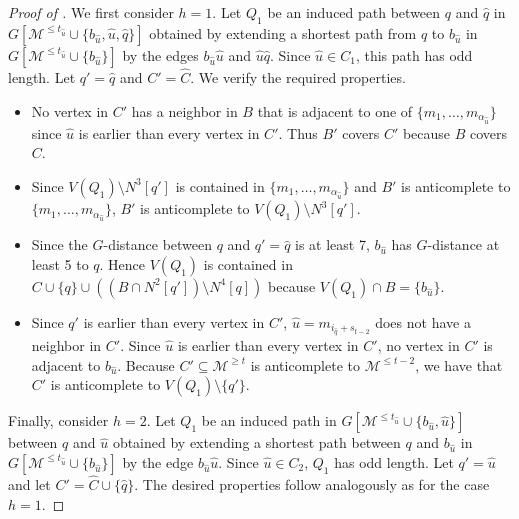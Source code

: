 \documentclass{article}
\begin{document}
\begin{proof}[Proof of ]
We first consider $h = 1$.
Let $Q_1$ be an induced path between $q$ and $\hat{q}$ in $G[\mathcal{M}^{\leq t_{\hat{u}}} \cup \{b_{\hat{u}}, \hat{u}, \hat{q}\}]$ obtained by extending a shortest path from $q$ to $b_{\hat{u}}$ in $G[ \mathcal{M}^{\leq t_{\hat{u}}} \cup \{b_{\hat{u}}\}]$ by the edges $b_{\hat{u}}\hat{u}$ and $\hat{u}\hat{q}$. Since $\hat{u} \in C_1$, this path has odd length. Let $q' = \hat{q}$ and $C' = \widehat{C}$. We verify the required properties.

\begin{itemize}
    \item No vertex in $C'$ has a neighbor in $B$ that is adjacent to one of $\{m_1, \dots, m_{\alpha_{\hat{u}}}\}$ since $\hat{u}$ is earlier than every vertex in $C'$. Thus $B'$ covers $C'$ because $B$ covers $C$.
    \item Since $V(Q_1) \setminus N^3[q']$ is contained in $\{m_1, \dots, m_{\alpha_{\hat{u}}}\}$ and $B'$ is anticomplete to $\{ m_1, \dots, m_{\alpha_{\hat{u}}} \}$, $B'$ is anticomplete to $V(Q_1) \setminus N^3[q']$.
    \item Since the $G$-distance between $q$ and $q' = \hat{q}$ is at least 7, $b_{\hat{u}}$ has $G$-distance at least 5 to $q$. Hence $V(Q_1)$ is contained in $C \cup \{q\} \cup (( B \cap N^2[q'] ) \setminus N^4[q])$ because $V(Q_1) \cap B = \{b_{\hat{u}}\}$.
    \item Since $q'$ is earlier than every vertex in $C'$, $\hat{u} = m_{i_{\hat{q}} + s_{t -2}}$ does not have a neighbor in $C'$. Since $\hat{u}$ is earlier than every vertex in $C'$, no vertex in $C'$ is adjacent to $b_{\hat{u}}$. Because $C' \subseteq \mathcal{M}^{\geq t}$ is anticomplete to $\mathcal{M}^{\leq t- 2}$, we have that $C'$ is anticomplete to $V(Q_1) \setminus \{q'\}$.
\end{itemize}

Finally, consider $h = 2$. Let $Q_1$ be an induced path in $G[\mathcal{M}^{\leq t_{\hat{u}}} \cup \{b_{\hat{u}}, \hat{u}\}]$ between $q$ and $\hat{u}$ obtained by extending a shortest path between $q$ and $b_{\hat{u}}$ in $G[\mathcal{M}^{\leq t_{\hat{u}}} \cup \{b_{\hat{u}}\}]$ by the edge $b_{\hat{u}}\hat{u}$. Since $\hat{u} \in C_2$, $Q_1$ has odd length. Let $q' = \hat{u}$ and let $C' = \widehat{C} \cup \{ \hat{q} \}$. The desired properties follow analogously as for the case $h = 1$.


\end{proof}
\end{document}
